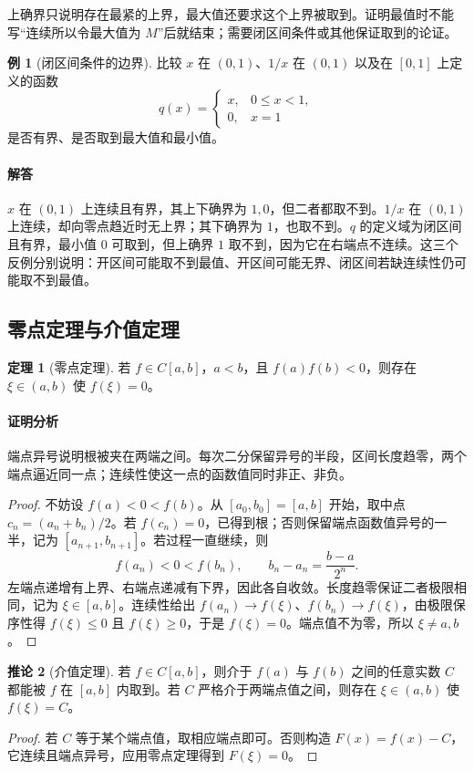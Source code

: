 \documentclass[UTF8,fontset=fandol,12pt,oneside,openany]{ctexrep}
\theoremstyle{definition}
\newtheorem{theorem}{定理}[chapter]
\newtheorem{corollary}[theorem]{推论}
\newtheorem{example}{例}[chapter]
\begin{document}
上确界只说明存在最紧的上界，最大值还要求这个上界被取到。证明最值时不能写“连续所以令最大值为 $M$”后就结束；需要闭区间条件或其他保证取到的论证。

\begin{example}[闭区间条件的边界]
比较 $x$ 在 $(0,1)$、$1/x$ 在 $(0,1)$ 以及在 $[0,1]$ 上定义的函数
\[
 q(x)=\begin{cases}x,&0\le x<1,\\0,&x=1\end{cases}
\]
是否有界、是否取到最大值和最小值。
\end{example}
\paragraph{解答}
$x$ 在 $(0,1)$ 上连续且有界，其上下确界为 $1,0$，但二者都取不到。$1/x$ 在 $(0,1)$ 上连续，却向零点趋近时无上界；其下确界为 $1$，也取不到。$q$ 的定义域为闭区间且有界，最小值 $0$ 可取到，但上确界 $1$ 取不到，因为它在右端点不连续。这三个反例分别说明：开区间可能取不到最值、开区间可能无界、闭区间若缺连续性仍可能取不到最值。

\subsection{零点定理与介值定理}
\label{lec:04:ivt}
\begin{theorem}[零点定理]
若 $f\in C[a,b]$，$a<b$，且 $f(a)f(b)<0$，则存在 $\xi\in(a,b)$ 使 $f(\xi)=0$。
\end{theorem}
\paragraph{证明分析}
端点异号说明根被夹在两端之间。每次二分保留异号的半段，区间长度趋零，两个端点逼近同一点；连续性使这一点的函数值同时非正、非负。
\begin{proof}
不妨设 $f(a)<0<f(b)$。从 $[a_0,b_0]=[a,b]$ 开始，取中点 $c_n=(a_n+b_n)/2$。若 $f(c_n)=0$，已得到根；否则保留端点函数值异号的一半，记为 $[a_{n+1},b_{n+1}]$。若过程一直继续，则
\[
 f(a_n)<0<f(b_n),\qquad b_n-a_n=\frac{b-a}{2^n}.
\]
左端点递增有上界、右端点递减有下界，因此各自收敛。长度趋零保证二者极限相同，记为 $\xi\in[a,b]$。连续性给出 $f(a_n)\to f(\xi)$、$f(b_n)\to f(\xi)$，由极限保序性得 $f(\xi)\le0$ 且 $f(\xi)\ge0$，于是 $f(\xi)=0$。端点值不为零，所以 $\xi\ne a,b$。
\end{proof}

\begin{corollary}[介值定理]
若 $f\in C[a,b]$，则介于 $f(a)$ 与 $f(b)$ 之间的任意实数 $C$ 都能被 $f$ 在 $[a,b]$ 内取到。若 $C$ 严格介于两端点值之间，则存在 $\xi\in(a,b)$ 使 $f(\xi)=C$。
\end{corollary}
\begin{proof}
若 $C$ 等于某个端点值，取相应端点即可。否则构造 $F(x)=f(x)-C$，它连续且端点异号，应用零点定理得到 $F(\xi)=0$。
\end{proof}
\end{document}
